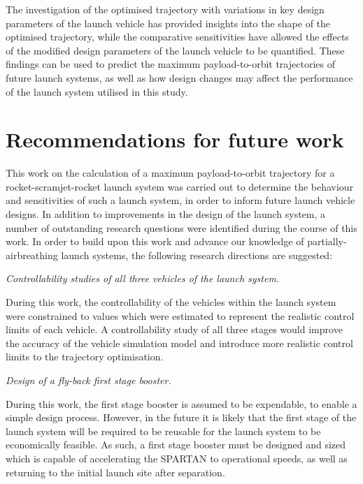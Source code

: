 The investigation of the optimised trajectory with variations in key design parameters of the launch vehicle has provided insights into the shape of the optimised trajectory, while the comparative sensitivities have allowed the effects of the modified design parameters of the launch vehicle to be quantified. These findings can be used to predict the maximum payload-to-orbit trajectories of future launch systems, as well as how design changes may affect the performance of the launch system utilised in this study. 

  \chapter{Recommendations for future work}
 This work on the calculation of a maximum payload-to-orbit trajectory for a rocket-scramjet-rocket launch system was carried out to determine the behaviour and sensitivities of such a launch system, in order to inform future launch vehicle designs. 
 In addition to improvements in the design of the launch system, a number of outstanding research questions were identified during the course of this work.
 In order to build upon this work and advance our knowledge of partially-airbreathing launch systems, the following research directions are suggested:

\vspace{10pt}
\textit{Controllability studies of all three vehicles of the launch system.}

 \noindent
During this work, the controllability of the vehicles within the launch system were constrained to values which were estimated to represent the realistic control limits of each vehicle. 
A controllability study of all three stages would improve the accuracy of the vehicle simulation model and introduce more realistic control limits to the trajectory optimisation. 

\vspace{10pt}
 \textit{Design of a fly-back first stage booster.}
 
 \noindent
 During this work, the first stage booster is assumed to be expendable, to enable a simple design process. However, in the future it is likely that the first stage of the launch system will be required to be reusable for the launch system to be economically feasible. As such, a first stage booster must be designed and sized which is capable of accelerating the SPARTAN to operational speeds, as well as returning to the initial launch site after separation. 

